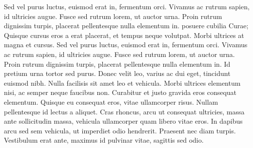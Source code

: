 \documentclass[twoside]{article}
\begin{document}
\autoversenumber Sed vel purus luctus, euismod erat in, fermentum orci.
\autoversenumber Vivamus ac rutrum sapien, id ultricies augue.
\autoversenumber Fusce sed rutrum lorem, ut auctor urna.
\autoversenumber Proin rutrum dignissim turpis, placerat pellentesque nulla elementum in.
\autoversenumber posuere cubilia Curae; Quisque cursus eros a erat placerat, et tempus neque volutpat.
\autoversenumber Morbi ultrices at magna et cursus.
\autoversenumber Sed vel purus luctus, euismod erat in, fermentum orci.
\autoversenumber Vivamus ac rutrum sapien, id ultricies augue.
\autoversenumber Fusce sed rutrum lorem, ut auctor urna.
\autoversenumber Proin rutrum dignissim turpis, placerat pellentesque nulla elementum in.
\autoversenumber Id pretium urna tortor sed purus.
\autoversenumber Donec velit leo, varius ac dui eget, tincidunt euismod nibh.
\autoversenumber Nulla facilisis sit amet leo et vehicula.
\autoversenumber Morbi ultrices elementum nisi, ac semper neque faucibus non.
\autoversenumber Curabitur et justo gravida eros consequat elementum.
\autoversenumber Quisque eu consequat eros, vitae ullamcorper risus.
\autoversenumber Nullam pellentesque id lectus a aliquet.
\autoversenumber Cras rhoncus, arcu ut consequat ultricies, massa ante sollicitudin massa, vehicula ullamcorper quam libero vitae eros.
\autoversenumber In dapibus arcu sed sem vehicula, ut imperdiet odio hendrerit.
\autoversenumber Praesent nec diam turpis.
\autoversenumber Vestibulum erat ante, maximus id pulvinar vitae, sagittis sed odio.

\pend
\endnumbering
\end{document}
